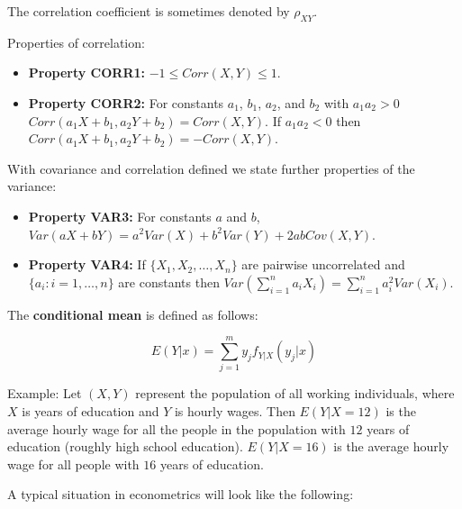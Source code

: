 \documentclass[11pt]{article}
\begin{document}
The correlation coefficient is sometimes denoted by $\rho_{XY}$.

\vspace{2mm}

Properties of correlation:

\begin{itemize}
 \item[] \textbf{Property CORR1:} $-1 \leq Corr(X,Y) \leq 1$.
 \item[] \textbf{Property CORR2:} For constants $a_{1}$, $b_{1}$, $a_{2}$, and $b_{2}$ with $a_{1}a_{2} > 0$
         $Corr(a_{1}X + b_{1}, a_{2}Y + b_{2}) = Corr(X,Y)$. If $a_{1}a_{2} < 0$ then 
         $Corr(a_{1}X + b_{1}, a_{2}Y + b_{2}) = -Corr(X,Y)$.
\end{itemize}

\vspace{2mm}

With covariance and correlation defined we state further properties of the variance:

\begin{itemize}
 \item[] \textbf{Property VAR3:} For constants $a$ and $b$, $Var(aX + bY) = a^{2} Var(X) + b^{2} Var(Y) + 2abCov(X,Y)$.
 \item[] \textbf{Property VAR4:} If $\{X_{1}, X_{2}, \ldots, X_{n}\}$ are pairwise uncorrelated and 
         $\{a_{i}: i=1, \ldots, n \}$ are constants then
         $Var(\sum\limits_{i=1}^{n} a_{i} X_{i}) = \sum\limits_{i=1}^{n} a_{i}^{2} Var(X_{i})$.
\end{itemize}

\vspace{2mm}

The \textbf{conditional mean} is defined as follows:

\begin{equation*}
E(Y|x) = \sum\limits_{j=1}^{m} y_{j} f_{Y|X}(y_{j}|x)
\end{equation*}

Example: Let $(X,Y)$ represent the population of all working individuals, where $X$ is years of education and $Y$
is hourly wages. Then $E(Y|X=12)$ is the average hourly wage for all the people in the population with $12$ years
of education (roughly high school education). $E(Y|X=16)$ is the average hourly wage for all people with $16$ years
of education. 

\vspace{2mm}

A typical situation in econometrics will look like the following:
\end{document}
